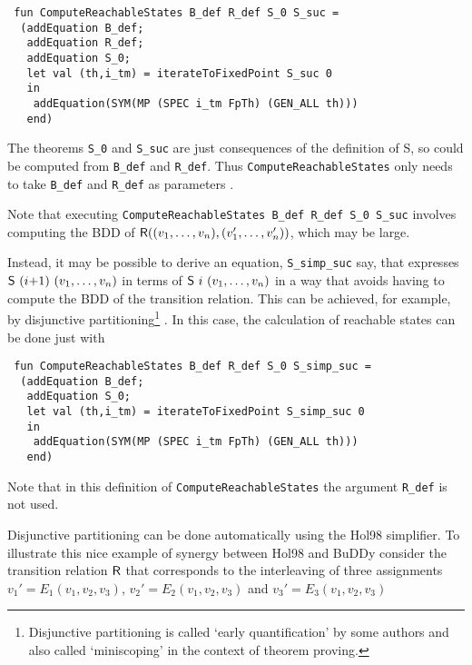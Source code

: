 \documentclass[12pt]{article}
\newcommand{\con}[1]{\mbox{\sf #1}}
\newcommand{\ml}[1]{{\tt #1}}
\newcommand\Hol{Hol98\xspace}
\newcommand{\Buddy}{BuDDy\xspace}
\begin{document}
\vspace*{-1mm}

\begin{verbatim}
 fun ComputeReachableStates B_def R_def S_0 S_suc =
  (addEquation B_def;
   addEquation R_def;
   addEquation S_0;
   let val (th,i_tm) = iterateToFixedPoint S_suc 0
   in
    addEquation(SYM(MP (SPEC i_tm FpTh) (GEN_ALL th)))
   end)
\end{verbatim}

\vspace*{-1mm}

The theorems \ml{S\_0} and \ml{S\_suc} are just consequences
of the definition of \con{S}, so could be computed from
\ml{B\_def} and \ml{R\_def}. Thus \ml{ComputeReachableStates}
only needs to take \ml{B\_def} and \ml{R\_def} as parameters
\cite{mjcg99a}.

Note that executing {\verb+ComputeReachableStates B_def R_def S_0 S_suc+}
involves computing the BDD of
$\con{R}((v_1,\ldots,v_n),(v'_1,\ldots,v'_n))$, which may be
large. 

Instead, it may be possible to derive an equation, \ml{S\_simp\_suc} say, that expresses
$\con{S}~(i{+}1)~(v_1,\ldots,v_n)$ in terms of
$\con{S}~i~(v_1,\ldots,v_n)$ in a way that avoids having to compute
the BDD of the transition relation. This can be achieved, for example,
by disjunctive partitioning\footnote{Disjunctive partitioning is
called `early quantification' by some authors \cite[page~45]{McMillanBook}
and also called `miniscoping' in the context of theorem proving.}
\cite[page~79]{ClarkeBook}. In this case, the calculation of reachable states can be done just with

\vspace*{-1mm}

\begin{verbatim}
 fun ComputeReachableStates B_def R_def S_0 S_simp_suc =
  (addEquation B_def;
   addEquation S_0;
   let val (th,i_tm) = iterateToFixedPoint S_simp_suc 0
   in
    addEquation(SYM(MP (SPEC i_tm FpTh) (GEN_ALL th)))
   end)
\end{verbatim}

\vspace*{-1mm}

Note that in this definition of \ml{ComputeReachableStates} the argument \ml{R\_def} is not used.

Disjunctive partitioning can be done automatically using the
\Hol{} simplifier. To illustrate this 
nice example of synergy between \Hol{} and
\Buddy{}
consider the transition relation $\con{R}$ that
corresponds to the interleaving of three
assignments $v_1' = E_1(v_1,v_2,v_3)$, $v_2' = E_2(v_1,v_2,v_3)$ and $v_3' = E_3(v_1,v_2,v_3)$
\end{document}
